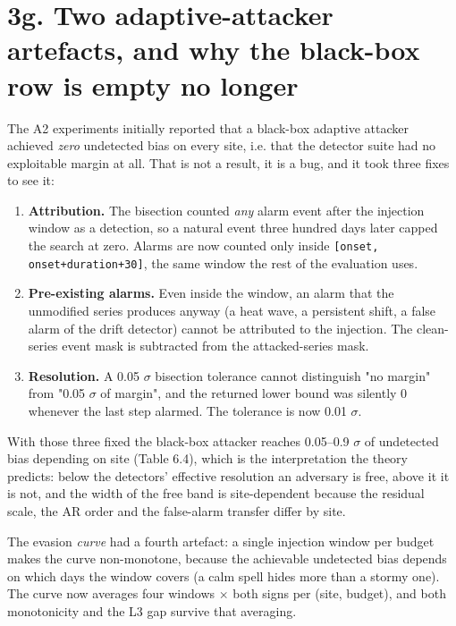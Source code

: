 \documentclass[10pt,a4paper]{article}
\begin{document}
\section*{3g. Two adaptive-\allowbreak{}attacker artefacts, and why the black-\allowbreak{}box row is empty no longer}
The A2 experiments initially reported that a black-\allowbreak{}box adaptive attacker achieved \emph{zero} undetected bias on every site, i.e. that the detector suite had no exploitable margin at all. That is not a result, it is a bug, and it took three fixes to see it:

\begin{enumerate}
\item \textbf{Attribution.} The bisection counted \emph{any} alarm event after the injection
window as a detection, so a natural event three hundred days later capped the search at zero. Alarms are now counted only inside \texttt{[onset, onset+duration+30]}, the same window the rest of the evaluation uses.

\item \textbf{Pre-\allowbreak{}existing alarms.} Even inside the window, an alarm that the unmodified
series produces anyway (a heat wave, a persistent shift, a false alarm of the drift detector) cannot be attributed to the injection. The clean-\allowbreak{}series event mask is subtracted from the attacked-\allowbreak{}series mask.

\item \textbf{Resolution.} A 0.05 $\sigma$ bisection tolerance cannot distinguish "no margin"
from "0.05 $\sigma$ of margin", and the returned lower bound was silently 0 whenever the last step alarmed. The tolerance is now 0.01 $\sigma$.

\end{enumerate}

With those three fixed the black-\allowbreak{}box attacker reaches 0.05–0.9 $\sigma$ of undetected bias depending on site (Table 6.4), which is the interpretation the theory predicts: below the detectors' effective resolution an adversary is free, above it it is not, and the width of the free band is site-\allowbreak{}dependent because the residual scale, the AR order and the false-\allowbreak{}alarm transfer differ by site.

The evasion \emph{curve} had a fourth artefact: a single injection window per budget makes the curve non-\allowbreak{}monotone, because the achievable undetected bias depends on which days the window covers (a calm spell hides more than a stormy one). The curve now averages four windows $\times$ both signs per (site, budget), and both monotonicity and the L3 gap survive that averaging.
\end{document}
